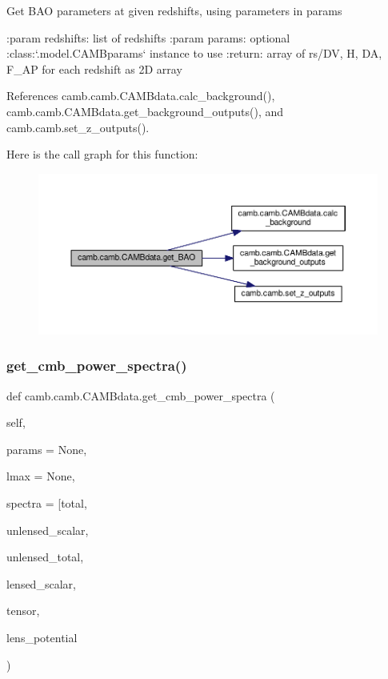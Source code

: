 \begin{DoxyVerb}Get BAO parameters at given redshifts, using parameters in params

:param redshifts: list of redshifts
:param params: optional :class:`.model.CAMBparams` instance to use
:return: array of rs/DV, H, DA, F_AP for each redshift as 2D array
\end{DoxyVerb}
 

References camb.\+camb.\+C\+A\+M\+Bdata.\+calc\+\_\+background(), camb.\+camb.\+C\+A\+M\+Bdata.\+get\+\_\+background\+\_\+outputs(), and camb.\+camb.\+set\+\_\+z\+\_\+outputs().

Here is the call graph for this function\+:
\nopagebreak
\begin{figure}[H]
\begin{center}
\leavevmode
\includegraphics[width=350pt]{classcamb_1_1camb_1_1CAMBdata_a4428c1c04012e8bfc4015656ed24412e_cgraph}
\end{center}
\end{figure}
\mbox{\label{classcamb_1_1camb_1_1CAMBdata_a59d6f78493417bf69c40475e4c9a697f}} 
\subsubsection{\texorpdfstring{get\+\_\+cmb\+\_\+power\+\_\+spectra()}{get\_cmb\_power\_spectra()}}
{\footnotesize\ttfamily def camb.\+camb.\+C\+A\+M\+Bdata.\+get\+\_\+cmb\+\_\+power\+\_\+spectra (\begin{DoxyParamCaption}\item[{}]{self,  }\item[{}]{params = {\ttfamily None},  }\item[{}]{lmax = {\ttfamily None},  }\item[{}]{spectra = {\ttfamily \mbox{[}\textquotesingle{}total\textquotesingle{}},  }\item[{}]{unlensed\+\_\+scalar,  }\item[{}]{unlensed\+\_\+total,  }\item[{}]{lensed\+\_\+scalar,  }\item[{}]{tensor,  }\item[{}]{lens\+\_\+potential }\end{DoxyParamCaption})}

